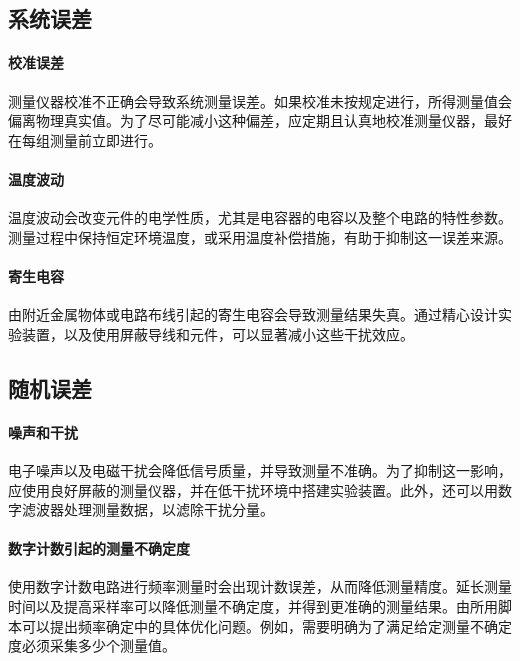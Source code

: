 \subsection{系统误差}

\paragraph{校准误差}
测量仪器校准不正确会导致系统测量误差。如果校准未按规定进行，所得测量值会偏离物理真实值。为了尽可能减小这种偏差，应定期且认真地校准测量仪器，最好在每组测量前立即进行。

\paragraph{温度波动}
温度波动会改变元件的电学性质，尤其是电容器的电容以及整个电路的特性参数。测量过程中保持恒定环境温度，或采用温度补偿措施，有助于抑制这一误差来源。

\paragraph{寄生电容}
由附近金属物体或电路布线引起的寄生电容会导致测量结果失真。通过精心设计实验装置，以及使用屏蔽导线和元件，可以显著减小这些干扰效应。

\subsection{随机误差}

\paragraph{噪声和干扰}
电子噪声以及电磁干扰会降低信号质量，并导致测量不准确。为了抑制这一影响，应使用良好屏蔽的测量仪器，并在低干扰环境中搭建实验装置。此外，还可以用数字滤波器处理测量数据，以滤除干扰分量。

\paragraph{数字计数引起的测量不确定度}
使用数字计数电路进行频率测量时会出现计数误差，从而降低测量精度。延长测量时间以及提高采样率可以降低测量不确定度，并得到更准确的测量结果。由所用脚本可以提出频率确定中的具体优化问题。例如，需要明确为了满足给定测量不确定度必须采集多少个测量值。
